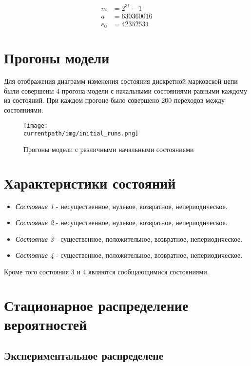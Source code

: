 \begin{align*}
    m & = 2^{31} - 1 \\
    a & = 630360016 \\
    e_0 & = 42352531
\end{align*}

\section*{Прогоны модели}

Для отображения диаграмм изменения состояния дискретной марковской цепи были совершены $4$ прогона модели
с начальными состояниями равными каждому из состояний. При каждом прогоне было совершено $200$ переходов между
состояниями.

\begin{figure}[h!]
    \centering
        \texttt{[image: \\currentpath/img/initial\_runs.png]}
    \caption{Прогоны модели с различными начальными состояниями}
\end{figure}

\section*{Характеристики состояний}

\begin{itemize}
    \item \textit{Состояние 1} - несущественное, нулевое, возвратное, непериодическое.
    \item \textit{Состояние 2} - несущественное, нулевое, возвратное, непериодическое.
    \item \textit{Состояние 3} - существенное, положительное, возвратное, непериодическое.
    \item \textit{Состояние 4} - существенное, положительное, возвратное, непериодическое.
\end{itemize}

Кроме того состояния 3 и 4 являются сообщающимися состояниями.

\section*{Стационарное распределение вероятностей}

\subsection*{Экспериментальное распределене}


